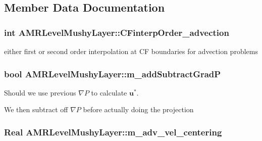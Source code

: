 \subsection{Member Data Documentation}
\hypertarget{class_a_m_r_level_mushy_layer_afcdd508c570b393a964397f344bfd4a1}{
\subsubsection[{C\-Finterp\-Order\-\_\-advection}]{\setlength{\rightskip}{0pt plus 5cm}int A\-M\-R\-Level\-Mushy\-Layer\-::\-C\-Finterp\-Order\-\_\-advection\hspace{0.3cm}{\ttfamily [protected]}}}\label{class_a_m_r_level_mushy_layer_afcdd508c570b393a964397f344bfd4a1}
either first or second order interpolation at C\-F boundaries for advection problems \hypertarget{class_a_m_r_level_mushy_layer_ae251dc2af22530cbf8a9311a2e83e442}{
\subsubsection[{m\-\_\-add\-Subtract\-Grad\-P}]{\setlength{\rightskip}{0pt plus 5cm}bool A\-M\-R\-Level\-Mushy\-Layer\-::m\-\_\-add\-Subtract\-Grad\-P\hspace{0.3cm}{\ttfamily [protected]}}}\label{class_a_m_r_level_mushy_layer_ae251dc2af22530cbf8a9311a2e83e442}


Should we use previous $ \nabla P $ to calculate $ \mathbf{u}^* $. 

We then subtract off $ \nabla P $ before actually doing the projection \hypertarget{class_a_m_r_level_mushy_layer_af41eb6058681e1345ce40633dd9fde1f}{
\subsubsection[{m\-\_\-adv\-\_\-vel\-\_\-centering}]{\setlength{\rightskip}{0pt plus 5cm}Real A\-M\-R\-Level\-Mushy\-Layer\-::m\-\_\-adv\-\_\-vel\-\_\-centering\hspace{0.3cm}{\ttfamily [protected]}}}\label{class_a_m_r_level_mushy_layer_af41eb6058681e1345ce40633dd9fde1f}


